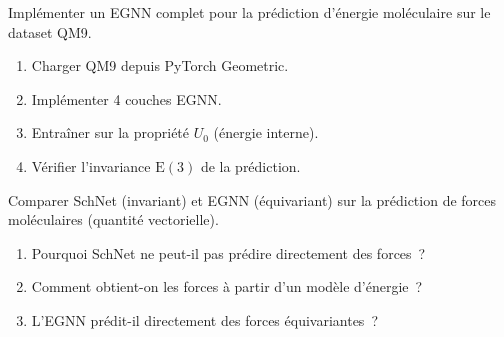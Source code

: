 \begin{exercice}
Impl\'ementer un EGNN complet pour la pr\'ediction d'\'energie mol\'eculaire sur
le dataset QM9.
\begin{enumerate}
    \item Charger QM9 depuis PyTorch Geometric.
    \item Impl\'ementer 4 couches EGNN.
    \item Entra\^iner sur la propri\'et\'e $U_0$ (\'energie interne).
    \item V\'erifier l'invariance $\mathrm{E}(3)$ de la pr\'ediction.
\end{enumerate}
\end{exercice}

\begin{exercice}
Comparer SchNet (invariant) et EGNN (\'equivariant) sur la pr\'ediction
de forces mol\'eculaires (quantit\'e vectorielle).
\begin{enumerate}
    \item Pourquoi SchNet ne peut-il pas pr\'edire directement des forces~?
    \item Comment obtient-on les forces \`a partir d'un mod\`ele d'\'energie~?
    \item L'EGNN pr\'edit-il directement des forces \'equivariantes~?
\end{enumerate}
\end{exercice}
